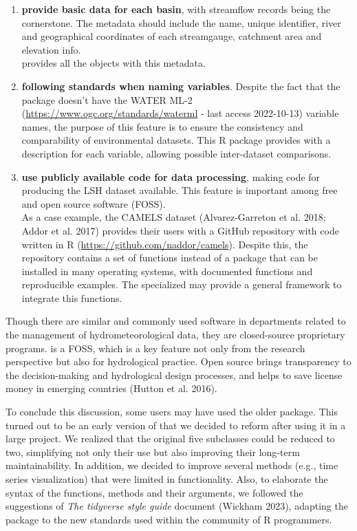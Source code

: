 \begin{enumerate}
\def\labelenumi{\arabic{enumi}.}
\item
  \textbf{provide basic data for each basin}, with streamflow records being
  the cornerstone. The metadata should include the name, unique identifier,
  river and geographical coordinates of each streamgauge, catchment area
  and elevation info.\\
   provides all the objects with this metadata.
\item
  \textbf{following standards when naming variables}. Despite the fact that
  the package doesn't have the WATER ML-2
  (\url{https://www.ogc.org/standards/waterml} - last access 2022-10-13)
  variable names, the purpose of this feature is to ensure the
  consistency and comparability of environmental datasets.
  This R package provides with a description for each variable,
  allowing possible inter-dataset comparisons.
\item
  \textbf{use publicly available code for data processing}, making code
  for producing the LSH dataset available. This feature is important
  among free and open source software (FOSS).\\
  As a case example, the CAMELS dataset (Alvarez-Garreton et al. 2018; Addor et al. 2017) provides
  their users with a GitHub repository with code written in R
  (\url{https://github.com/naddor/camels}). Despite this, the repository
  contains a set of functions instead of a package that can be installed
  in many operating systems, with documented functions and reproducible
  examples. The specialized  may provide a general framework
  to integrate this functions.
\end{enumerate}

Though there are similar and commonly used software in departments related
to the management of hydrometeorological data, they are closed-source
proprietary programs.  is a FOSS, which
is a key feature not only from the research perspective but also
for hydrological
practice. Open source brings transparency to the decision-making
and hydrological design processes, and helps to save license money
in emerging countries (Hutton et al. 2016).

To conclude this discussion, some users may have used the
older  package. This turned out to be an
early version of  that we decided to reform after
using it in a large project. We realized that the original five
subclasses could be reduced to two, simplifying not only their use
but also improving their long-term maintainability. In addition, we decided
to improve several methods (e.g., time series visualization) that were
limited in functionality. Also, to elaborate the syntax of the functions,
methods and their arguments, we followed the suggestions of
\emph{The tidyverse style guide} document (Wickham 2023), adapting the package
to the new standards used within the community of R programmers.

